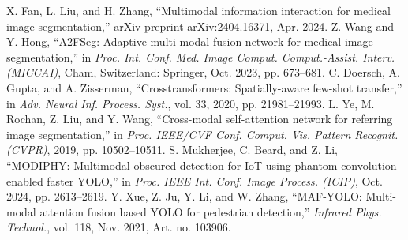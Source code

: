 \begin{thebibliography}{00}
 X. Fan, L. Liu, and H. Zhang, ``Multimodal information interaction for medical image segmentation,'' arXiv preprint arXiv:2404.16371, Apr. 2024.
 Z. Wang and Y. Hong, ``A2FSeg: Adaptive multi-modal fusion network for medical image segmentation,'' in {\it Proc. Int. Conf. Med. Image Comput. Comput.-Assist. Interv. (MICCAI)}, Cham, Switzerland: Springer, Oct. 2023, pp. 673--681.
 C. Doersch, A. Gupta, and A. Zisserman, ``Crosstransformers: Spatially-aware few-shot transfer,'' in {\it Adv. Neural Inf. Process. Syst.}, vol. 33, 2020, pp. 21981--21993.
 L. Ye, M. Rochan, Z. Liu, and Y. Wang, ``Cross-modal self-attention network for referring image segmentation,'' in {\it Proc. IEEE/CVF Conf. Comput. Vis. Pattern Recognit. (CVPR)}, 2019, pp. 10502--10511.
 S. Mukherjee, C. Beard, and Z. Li, ``MODIPHY: Multimodal obscured detection for IoT using phantom convolution-enabled faster YOLO,'' in {\it Proc. IEEE Int. Conf. Image Process. (ICIP)}, Oct. 2024, pp. 2613--2619.
 Y. Xue, Z. Ju, Y. Li, and W. Zhang, ``MAF-YOLO: Multi-modal attention fusion based YOLO for pedestrian detection,'' {\it Infrared Phys. Technol.}, vol. 118, Nov. 2021, Art. no. 103906.

\end{thebibliography}